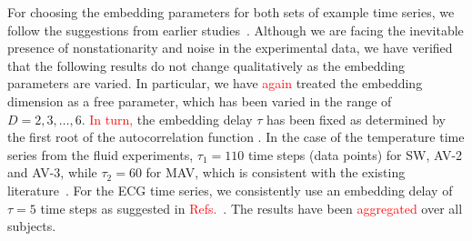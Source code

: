 \documentclass[aip,cha,reprint,nofootinbib]{revtex4-1}
\begin{document}
For choosing the embedding parameters for both sets of example time series, we follow the suggestions from earlier studies~\cite{ZouEPJST2008,smallCSF2002}. Although we are facing the inevitable presence of nonstationarity and noise in the experimental data, we have verified that the following results do not change {\color{red}qualitatively as} the embedding parameters are varied. In particular, we have \textcolor{red}{again} treated the embedding dimension as a free parameter, which has been varied in the range of $D = 2, 3, \ldots, 6$. \textcolor{red}{In turn,} the embedding delay $\tau$ has been {\color{red}fixed as determined by the first root of the autocorrelation function \cite{Kantz97}. In the case of the temperature time series from the fluid experiments, $\tau_{1} = 110$ time steps (data points) for SW, AV-2 and AV-3, while $\tau_{2} = 60$ for MAV,  which is consistent with the existing literature~\cite{Read_jfm_1992,thiel2004a}.} For the ECG time series, we consistently use an embedding delay of $\tau = 5$ time steps as suggested in \textcolor{red}{Refs.}~\cite{smallCSF2002}. The results have been \textcolor{red}{aggregated} over all subjects. 
\end{document}
